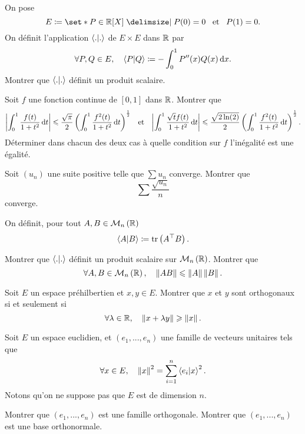 \documentclass{magnolia}
\begin{document}

On pose
\[E\defeq\enstq{P\in\polyR}{P(0)=0 \et P(1)=0}.\]
On définit l'application $\left\langle {.}\middle|{.}\right\rangle$ de $E\times E$ dans $\mathbb{R}$ par
\[\forall P,Q\in E,\quad \left\langle {P}\middle|{Q}\right\rangle\coloneqq-\int_{0}^{1} P''(x)Q(x)\,\text{d}x.\]
Montrer que $\left\langle {.}\middle|{.}\right\rangle$ définit un produit scalaire.



Soit $f$ une fonction continue de $[0,1]$ dans $\mathbb{R}$. Montrer que
\[\left|\int_{0}^{1} \frac{f(t)}{1+t^2}\,\text{d}t\right|\leqslant\frac{\sqrt{\pi}}{2}
  \left(\int_{0}^{1} \frac{f^2(t)}{1+t^2}\,\text{d}t\right)^{\frac{1}{2}} \quad\!\text{et}\quad\! 
  \left|\int_{0}^{1} \frac{\sqrt{t}f(t)}{1+t^2}\,\text{d}t\right|\leqslant\frac{\sqrt{2 \ln(2)}}{2}
  \left(\int_{0}^{1} \frac{f^2(t)}{1+t^2}\,\text{d}t\right)^{\frac{1}{2}}.\]
Déterminer dans chacun des deux cas à quelle condition sur $f$ l'inégalité est une
égalité.

Soit $(u_n)$ une suite positive telle que $\sum u_n$ converge. Montrer que
\[\sum \frac{\sqrt{u_n}}{n}\]
converge.


On définit, pour tout $A,B\in\mathcal{M}_{n}\left(\mathbb{R}\right)$
\[\left\langle {A}\middle|{B}\right\rangle\coloneqq\operatorname{tr}\left({A}^{\top}B\right).\]
\begin{questions}
\question Montrer que $\left\langle {.}\middle|{.}\right\rangle$ définit un produit scalaire sur $\mathcal{M}_{n}\left(\mathbb{R}\right)$.
\question Montrer que
  \[\forall A,B\in\mathcal{M}_{n}\left(\mathbb{R}\right),\quad \left\|AB\right\|\leqslant\left\|A\right\|\left\|B\right\|.\]
\end{questions}


Soit $E$ un espace préhilbertien et $x,y\in E$. Montrer que $x$ et $y$ sont orthogonaux si
et seulement si
\[\forall \lambda\in\mathbb{R} ,\quad \left\|x+\lambda y\right\|\geqslant\left\|x\right\|.\]

Soit $E$ un espace euclidien, et $(e_{1},...,e_{n})$ une famille de vecteurs unitaires
tels que
\[\forall x\in E,\quad \left\|x\right\|^2=\sum_{i=1}^{n}\left\langle {e_i}\middle|{x}\right\rangle^{2}.\]
Notons qu'on ne suppose pas que $E$ est de dimension $n$.
\begin{questions}
\question Montrer que $(e_{1},...,e_{n})$ est une famille orthogonale.  
\question Montrer que $(e_{1},...,e_{n})$ est une base orthonormale.                                   
\end{questions}
\end{document}
